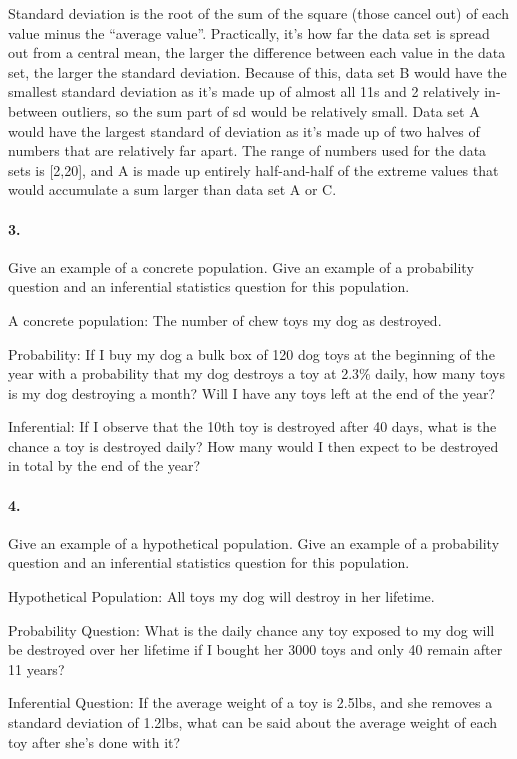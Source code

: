     \begin{mdframed}
        Standard deviation is the root of the sum of the square (those cancel out) of each value minus the ``average value''. Practically, it's how far the data set is spread out from a central mean, the larger the difference between each value in the data set, the larger the standard deviation. Because of this, data set B would have the smallest standard deviation as it's made up of almost all 11s and 2 relatively in-between outliers, so the sum part of sd would be relatively small. Data set A would have the largest standard of deviation as it's made up of two halves of numbers that are relatively far apart. The range of numbers used for the data sets is [2,20], and A is made up entirely half-and-half of the extreme values that would accumulate a sum larger than data set A or C.
    \end{mdframed}

    \paragraph*{3.}
    Give an example of a concrete population. Give an example of a probability question and an inferential statistics question for this population.

    \begin{mdframed}
        A concrete population: The number of chew toys my dog as destroyed.

        Probability: If I buy my dog a bulk box of 120 dog toys at the beginning of the year with a probability that my dog destroys a toy at 2.3\% daily, how many toys is my dog destroying a month? Will I have any toys left at the end of the year?

        Inferential: If I observe that the 10th toy is destroyed after 40 days, what is the chance a toy is destroyed daily? How many would I then expect to be destroyed in total by the end of the year?
    \end{mdframed}

    \paragraph*{4.}
    Give an example of a hypothetical population. Give an example of a probability question and an inferential statistics question for this population.

    \begin{mdframed}
        Hypothetical Population: All toys my dog will destroy in her lifetime.

        Probability Question: What is the daily chance any toy exposed to my dog will be destroyed over her lifetime if I bought her 3000 toys and only 40 remain after 11 years?

        Inferential Question: If the average weight of a toy is 2.5lbs, and she removes a standard deviation of 1.2lbs, what can be said about the average weight of each toy after she's done with it?
    \end{mdframed}

